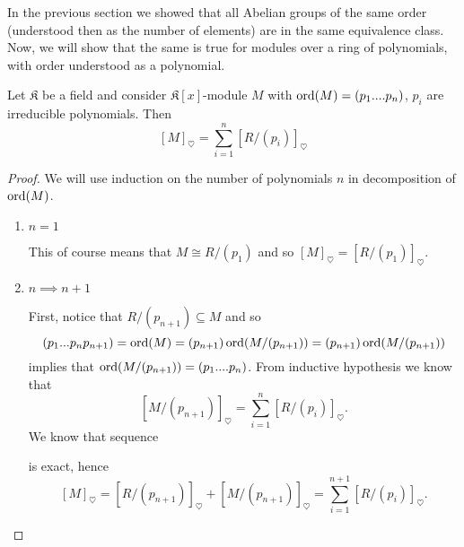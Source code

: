 In the previous section we showed that all Abelian groups of the same order (understood then as the number of elements) are in the same equivalence class. Now, we will show that the same is true for modules over a ring of polynomials, with order understood as a polynomial.

\begin{lemma}
  Let $\mathfrak{K}$ be a field and consider $\mathfrak{K}[x]$-module $M$ with $\operatorname{ord}(M)=(p_1....p_n)$, $p_i$ are irreducible polynomials. Then 
  $$[M]_\heartsuit=\sum_{i=1}^n [R/(p_i)]_\heartsuit$$
\end{lemma}

\begin{proof}
  We will use induction on the number of polynomials $n$ in decomposition of $\operatorname{ord}(M)$. 

  \begin{enumerate}
    \item $n=1$ 

      This of course means that $M\cong R/(p_1)$ and so $[M]_\heartsuit=[R/(p_1)]_\heartsuit$.
    \item $n\implies n+1$ 

      First, notice that $R/(p_{n+1})\subseteq M$ and so 
      $$(p_1...p_np_{n+1})=\operatorname{ord}(M)=(p_{n+1})\operatorname{ord}(M/(p_{n+1}))=(p_{n+1})\operatorname{ord}(M/(p_{n+1}))$$
      implies that $\operatorname{ord}(M/(p_{n+1}))=(p_1....p_n)$. From inductive hypothesis we know that 
      $$[M/(p_{n+1})]_\heartsuit=\sum_{i=1}^n[R/(p_i)]_\heartsuit.$$
      We know that sequence
      \begin{center}\end{center}
      is exact, hence
      $$[M]_\heartsuit=[R/(p_{n+1})]_\heartsuit+[M/(p_{n+1})]_\heartsuit=\sum_{i=1}^{n+1}[R/(p_i)]_\heartsuit.$$
  \end{enumerate}
\end{proof}

